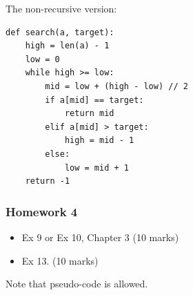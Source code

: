 \documentclass[aspectratio=169, 14pt]{beamer}
\begin{document}
\begin{frame}[fragile]
The non-recursive version:

\begin{verbatim}
def search(a, target):
    high = len(a) - 1
    low = 0
    while high >= low:
        mid = low + (high - low) // 2
        if a[mid] == target:
            return mid
        elif a[mid] > target:
            high = mid - 1
        else:
            low = mid + 1
    return -1
\end{verbatim}
    

\end{frame}

\begin{frame}
    \frametitle{Homework 4}
\begin{itemize}
    \item Ex 9 or Ex 10, Chapter 3 (10 marks)
    \item Ex 13. (10 marks)
\end{itemize}
Note that pseudo-code is allowed.
\end{frame}
\end{document}
